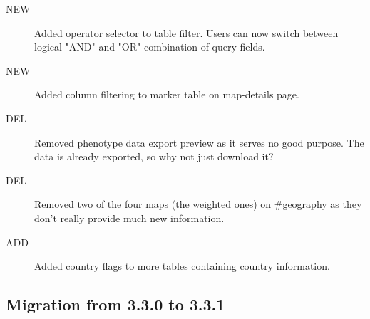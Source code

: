 \begin{description}
	\item[NEW] Added operator selector to table filter. Users can now switch between logical "AND" and "OR" combination of query fields.
	\item[NEW] Added column filtering to marker table on map-details page.
	\item[DEL] Removed phenotype data export preview as it serves no good purpose. The data is already exported, so why not just download it?
	\item[DEL] Removed two of the four maps (the weighted ones) on \#geography as they don't really provide much new information.
	\item[ADD] Added country flags to more tables containing country information.
\end{description}

\subsection{Migration from 3.3.0 to 3.3.1}

